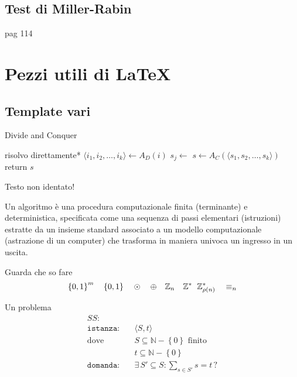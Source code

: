 \subsection{Test di Miller-Rabin}
pag 114

\section{Pezzi utili di \LaTeX{}}

\subsection{Template vari}

\begin{algorithm}[H]
\caption{Divide and Conquer}\label{alg:dnc}
\begin{algorithmic}[1]
            \State *risolvo direttamente*
        \EndIf
        \State $\langle i_1, i_2, \dots, i_k \rangle \gets A_D(i)$ 
            \State $s_j \gets $ 
        \EndFor
        \State $s \gets A_C(\langle s_1, s_2, \dots, s_k \rangle)$
        \State return $s$
    \EndProcedure
\end{algorithmic}
\end{algorithm}
\noindent
Testo non identato!

\begin{definition}[Algoritmo]\label{def:algex}
    Un algoritmo è una procedura computazionale finita (terminante) e deterministica, specificata come una sequenza di passi elementari (istruzioni) estratte da un insieme standard associato a un modello computazionale (astrazione di un computer) che trasforma in maniera univoca un ingresso in un uscita.
\end{definition}

Guarda che so fare
\begin{equation*}
    \left\{0,1\right\}^{m}
    \quad
    \left\{0,1\right\}^{}
    \quad
    \odot
    \quad
    \oplus
    \quad
    \mathbb{Z}_{n}
    \quad
    \mathbb{Z}_{\quad}^{*}
    \mathbb{Z}_{\rho(n)}^{*}
    \quad
    \equiv_n
\end{equation*}

Un problema
\begin{align*}
    SS: & \\
    \texttt{istanza:} \quad &
    \langle
        S,t
    \rangle
    \\
    \text{dove} \quad &
    S \subseteq \mathbb{N} - \left\{ 0 \right\} \text{ finito}
    \\
    &
    t \subseteq \mathbb{N} - \left\{ 0 \right\} \\
    \texttt{domanda:} \quad &
    \exists \, S' \subseteq S : \sum_{s \in S'}^{} s = t \, ?
\end{align*}

